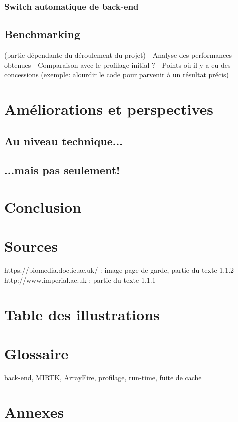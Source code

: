 \documentclass[10pt]{report}
\begin{document}
	\subsection{Switch automatique de back-end}
	\section{Benchmarking}
	(partie dépendante du déroulement du projet)\newline
	- Analyse des performances obtenues \newline
	- Comparaison avec le profilage initial ? \newline
	- Points où il y a eu des concessions (exemple: alourdir le code pour parvenir à un résultat précis)
	
\chapter{Améliorations et perspectives}
	\section{Au niveau technique...}
	\section{...mais pas seulement!}

\chapter*{Conclusion} %
\chapter*{Sources}
https://biomedia.doc.ic.ac.uk/  : image page de garde, partie du texte 1.1.2 \\
http://www.imperial.ac.uk : partie du texte 1.1.1
\chapter*{Table des illustrations}
\chapter*{Glossaire}
back-end, MIRTK, ArrayFire, profilage, run-time, fuite de cache
\chapter*{Annexes}
\end{document}
